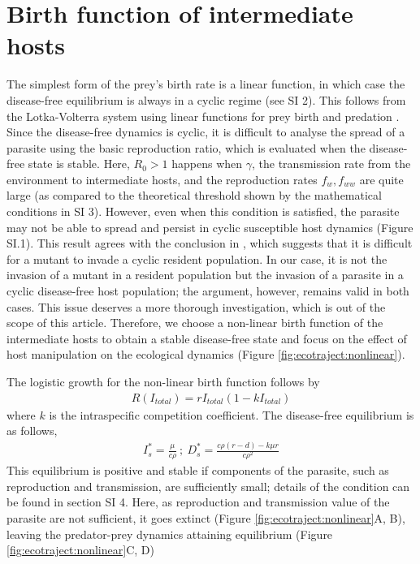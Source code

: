 \documentclass[a4paper]{scrartcl}
\begin{document}
\section*{Birth function of intermediate hosts}

The simplest form of the prey's birth rate is a linear function, in which case the disease-free equilibrium is always in a cyclic regime (see SI 2).
This follows from the Lotka-Volterra system using linear functions for prey birth and predation \citep{Lotka1920}.
Since the disease-free dynamics is cyclic, it is difficult to analyse the spread of a parasite using the basic reproduction ratio, which is evaluated when the disease-free state is stable. 
Here,  $R_0 > 1$  happens when $\gamma$, the transmission rate from the environment to intermediate hosts, and the reproduction rates $f_w, f_{ww}$ are quite large (as compared to the theoretical threshold shown by the mathematical conditions in SI 3). 
However, even when this condition is satisfied, the parasite may not be able to spread and persist in cyclic susceptible host dynamics (Figure SI.1). 
This result agrees with the conclusion in \citep{Ripa:Evol:2013}, which suggests that it is difficult for a mutant to invade a cyclic resident population. 
In our case, it is not the invasion of a mutant in a resident population but the invasion of a parasite in a cyclic disease-free host population; the argument, however, remains valid in both cases. 
This issue deserves a more thorough investigation, which is out of the scope of this article. 
Therefore, we choose a non-linear birth function of the intermediate hosts to obtain a stable disease-free state and focus on the effect of host manipulation on the ecological dynamics (Figure \ref{fig:ecotraject:nonlinear}). 

The logistic growth for the non-linear birth function follows by 
%
\begin{align*}
R(I_{total}) = r I_{total} (1 - k I_{total}) 
\end{align*}
%
where $k$ is the intraspecific competition coefficient. 
The disease-free equilibrium is as follows,
%
\begin{align*}
I_s^* = \frac{\mu}{c \rho } \ ;\  D_s^* = \frac{c \rho  (r-d) - k \mu  r}{c \rho ^2}
\end{align*}
%
This equilibrium is positive and stable if components of the parasite, such as reproduction and transmission, are sufficiently small; details of the condition can be found in section SI 4. 
Here, as reproduction and transmission value of the parasite are not sufficient, it goes extinct (Figure \ref{fig:ecotraject:nonlinear}A, B), leaving the predator-prey dynamics attaining equilibrium (Figure \ref{fig:ecotraject:nonlinear}C, D)
\end{document}
